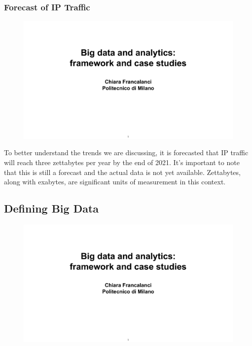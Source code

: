 \subsubsection{Forecast of IP Traffic}

\begin{figure}[!h]
  \centering
  \includegraphics[page=28, trim = 1.5cm 4.3cm 1.5cm 3.8cm, clip, width=\imagewidth]{images/06 - BIG_DATA.pdf}
\end{figure}

To better understand the trends we are discussing, it is forecasted that
IP traffic will reach three zettabytes per year by the end of 2021. It's
important to note that this is still a forecast and the actual data is
not yet available. Zettabytes, along with exabytes, are significant
units of measurement in this context.

\subsection{Defining Big Data}

\begin{figure}[!h]
  \centering
  \includegraphics[page=29, trim = 1.5cm 6.5cm 1.5cm 4.5cm, clip, width=\imagewidth]{images/06 - BIG_DATA.pdf}
\end{figure}

